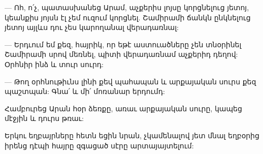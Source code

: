 \documentclass{article}
\begin{document}
{— Ոհ, ո՛չ, պատասխանեց Արամ, աչքերիս լոյսը կորցնելուց յետոյ, կեանքիս յոյսն էլ չեմ ուզում կորցնել. Շամիրամի ճանկն ընկնելուց յետոյ այլևս դու չես կարողանալ վերադառնալ:

— Երդւում եմ քեզ, հայրիկ, որ եթէ աստուածները չեն տնօրինել Շամիրամի սրով մեռնել, պիտի վերադառնամ աչքերիդ դեղով: Օրհնիր ինձ և տուր սուրդ:

— Թող օրհնութիւնս լինի քեվ պահապան և արքայական սուրս քեզ պաշտպան: Գնա՛ և մի՛ մոռանար երդումդ:

Համբուրեց Արան հօր ձեռքը, առաւ արքայական սուրը, կապեց մէջյին և դուրս թռաւ:

Երկու եղբայրները հետն եցին նրան, չկամենալով յետ մնալ եղբօրից իրենց դէպի հայրը զգացած սէրը արտայայտելում:}
\clearpage
\section{}
\end{document}
